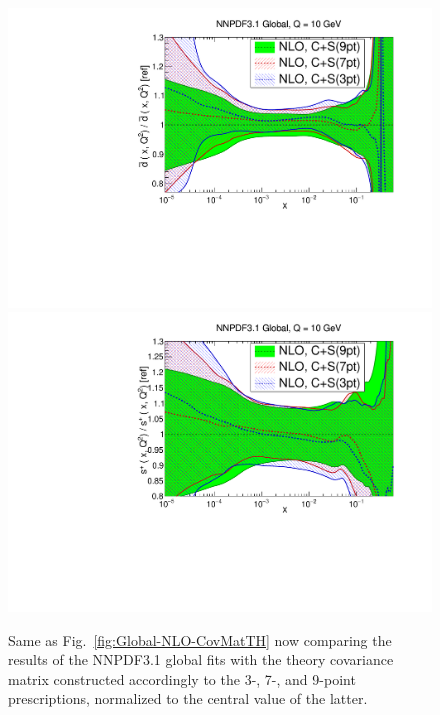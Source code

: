 \begin{figure}[t]
\begin{center}
    \includegraphics[scale=0.39]{mhous/plots/xdbar-Global-NLO-CovMatTH-prescriptions.pdf}
   \includegraphics[scale=0.39]{mhous/plots/xsp-Global-NLO-CovMatTH-prescriptions.pdf}
   \caption{\small Same as Fig.~\ref{fig:Global-NLO-CovMatTH} now
     comparing the results of the NNPDF3.1 global fits with the theory covariance matrix
     constructed accordingly to the 3-, 7-, and 9-point prescriptions, normalized
     to the central value of the latter.
    \label{fig:Global-NLO-CovMatTH-prescriptions} }
  \end{center}
\end{figure}
%

